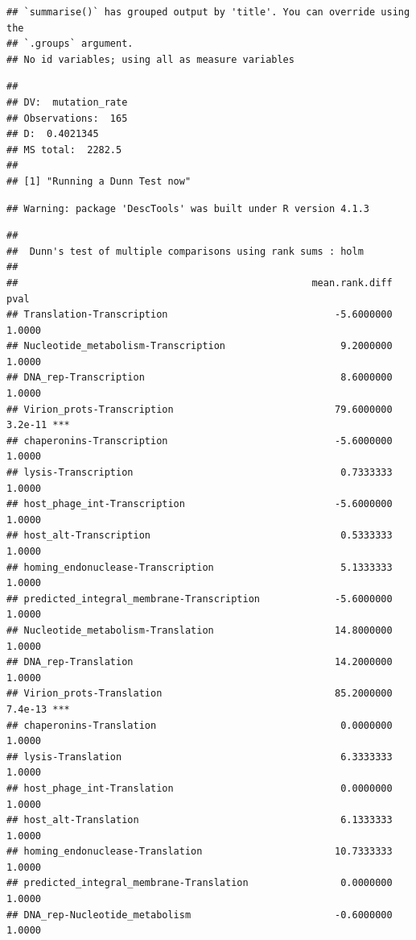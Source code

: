 \documentclass[
]{article}
\begin{document}
\begin{verbatim}
## `summarise()` has grouped output by 'title'. You can override using the
## `.groups` argument.
## No id variables; using all as measure variables
\end{verbatim}

\begin{verbatim}
## 
## DV:  mutation_rate 
## Observations:  165 
## D:  0.4021345 
## MS total:  2282.5 
## 
## [1] "Running a Dunn Test now"
\end{verbatim}

\begin{verbatim}
## Warning: package 'DescTools' was built under R version 4.1.3
\end{verbatim}

\begin{verbatim}
## 
##  Dunn's test of multiple comparisons using rank sums : holm  
## 
##                                                   mean.rank.diff    pval    
## Translation-Transcription                             -5.6000000  1.0000    
## Nucleotide_metabolism-Transcription                    9.2000000  1.0000    
## DNA_rep-Transcription                                  8.6000000  1.0000    
## Virion_prots-Transcription                            79.6000000 3.2e-11 ***
## chaperonins-Transcription                             -5.6000000  1.0000    
## lysis-Transcription                                    0.7333333  1.0000    
## host_phage_int-Transcription                          -5.6000000  1.0000    
## host_alt-Transcription                                 0.5333333  1.0000    
## homing_endonuclease-Transcription                      5.1333333  1.0000    
## predicted_integral_membrane-Transcription             -5.6000000  1.0000    
## Nucleotide_metabolism-Translation                     14.8000000  1.0000    
## DNA_rep-Translation                                   14.2000000  1.0000    
## Virion_prots-Translation                              85.2000000 7.4e-13 ***
## chaperonins-Translation                                0.0000000  1.0000    
## lysis-Translation                                      6.3333333  1.0000    
## host_phage_int-Translation                             0.0000000  1.0000    
## host_alt-Translation                                   6.1333333  1.0000    
## homing_endonuclease-Translation                       10.7333333  1.0000    
## predicted_integral_membrane-Translation                0.0000000  1.0000    
## DNA_rep-Nucleotide_metabolism                         -0.6000000  1.0000    

\end{verbatim}
\end{document}
